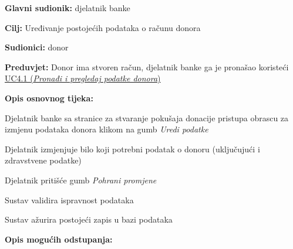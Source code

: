 					\noindent {}
					\begin{packed_item} \label{UC5.1}
	
						\item \textbf{Glavni sudionik: }djelatnik banke
						\item  \textbf{Cilj:} Uređivanje postojećih podataka o računu donora
						\item  \textbf{Sudionici:} donor
						\item  \textbf{Preduvjet:} Donor ima stvoren račun, djelatnik banke ga je pronašao koristeći \hyperref[UC4.1]{UC4.1 (\textit{Pronađi i pregledaj podatke donora})} 
						\item  \textbf{Opis osnovnog tijeka:}
						
						\item[] \begin{packed_enum}
	                        \item Djelatnik banke sa stranice za stvaranje pokušaja donacije pristupa obrascu za izmjenu podataka donora klikom na gumb \textit{Uredi podatke}
	                        \item Djelatnik izmjenjuje bilo koji potrebni podatak o donoru  (uključujući i zdravstvene podatke)
	                        \item Djelatnik pritišće gumb \textit{Pohrani promjene}
	                        \item Sustav validira ispravnost podataka
	                        \item Sustav ažurira postojeći zapis u bazi podataka
						\end{packed_enum}
						
						\item  \textbf{Opis mogućih odstupanja:}
						
						\item[] \begin{packed_item}
	

\end{packed_item}
\end{packed_item}
